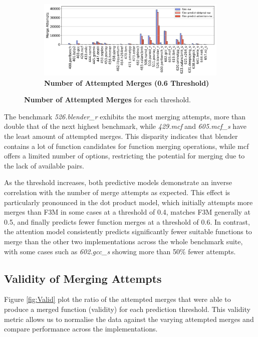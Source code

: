 \begin{figure}[tbh!]
\begin{subfigure}{\textwidth}
    \end{subfigure}
    \begin{subfigure}{\textwidth}
    \centering
        \includegraphics[scale=0.47]{Figures/Valid_Merging_Predictions/0.6_MergeAttempts.png}
        \caption{\textbf{Number of Attempted Merges (\textbf{0.6} Threshold)}} 
        \label{fig:0.6AttemptedMerges}
    \end{subfigure}

    \caption{\textbf{Number of Attempted Merges} for each threshold.} 
    \label{fig:AttemptedMerges}
\end{figure}

The benchmark \textit{526.blender\_r} exhibits the most merging attempts, more than double that of the next highest benchmark, while \textit{429.mcf} and \textit{605.mcf\_s} have the least amount of attempted merges. This disparity indicates that blender contains a lot of function candidates for function merging operations, while mcf offers a limited number of options, restricting the potential for merging due to the lack of available pairs.

As the threshold increases, both predictive models demonstrate an inverse correlation with the number of merge attempts as expected. This effect is particularly pronounced in the dot product model, which initially attempts more merges than F3M in some cases at a threshold of 0.4, matches F3M generally at 0.5, and finally predicts fewer function merges at a threshold of 0.6. In contrast, the attention model consistently predicts significantly fewer suitable functions to merge than the other two implementations across the whole benchmark suite, with some cases such as \textit{602.gcc\_s} showing more than 50\% fewer attempts.



\subsection{Validity of Merging Attempts}
Figure \ref{fig:Valid} plot the ratio of the attempted merges that were able to produce a merged function (validity) for each prediction threshold. This validity metric allows us to normalise the data against the varying attempted merges and compare performance across the implementations.

